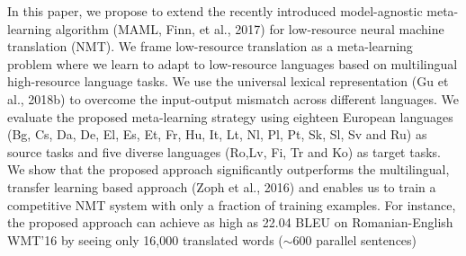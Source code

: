 In this paper, we propose to extend the recently introduced model-agnostic meta-learning algorithm (MAML, Finn, et al., 2017) for low-resource neural machine translation (NMT). We frame low-resource translation as a meta-learning problem where we learn to adapt to low-resource languages based on multilingual high-resource language tasks. We use the universal lexical representation (Gu et al., 2018b) to overcome the input-output mismatch across different languages. We evaluate the proposed meta-learning  strategy  using  eighteen  European  languages  (Bg,  Cs,  Da,  De,  El,  Es,  Et, Fr, Hu, It, Lt,  Nl, Pl, Pt, Sk, Sl, Sv and Ru) as source tasks and five diverse languages (Ro,Lv, Fi, Tr and Ko) as target tasks. We show that the proposed approach significantly outperforms the multilingual, transfer learning based approach  (Zoph et al.,  2016) and enables us to train a competitive NMT system with only a fraction of training examples. For instance, the proposed approach can achieve as high as 22.04 BLEU on Romanian-English WMT'16 by seeing only 16,000 translated words ($\sim$600 parallel sentences)
